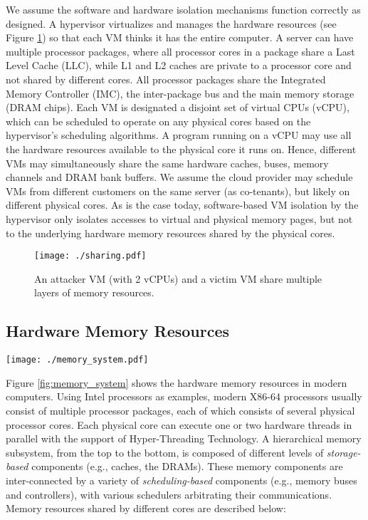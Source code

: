 \documentclass{sig-alternate}
\begin{document}
We assume the software and hardware isolation mechanisms function correctly as 
designed. A hypervisor virtualizes and manages the hardware resources (see Figure 
\ref{fig:sharing}) so that each VM thinks it has the entire computer. A server can 
have multiple processor packages, where all processor cores in a package share a 
Last Level Cache (LLC), while L1 and L2 caches are private to a processor core and not 
shared by different cores. All processor packages share the Integrated Memory 
Controller (IMC), the inter-package bus and the main memory storage (DRAM 
chips). Each VM is designated a disjoint set of virtual CPUs (vCPU), which can be 
scheduled to operate on any physical cores based on the hypervisor's scheduling 
algorithms. A program running on a vCPU may use all the hardware resources 
available to the physical core it runs on. Hence, different VMs may simultaneously 
share the same hardware caches, buses, memory channels and DRAM bank buffers. We 
assume the cloud provider may schedule VMs from different customers on the same 
server (as co-tenants), but likely on different physical cores. As is the case 
today, software-based VM isolation by the hypervisor only isolates accesses to 
virtual and physical memory pages, but not to the underlying hardware memory 
resources shared by the physical cores.


\begin{figure}[t]
\centerline{\mbox{\texttt{[image: ./sharing.pdf]}}}
\caption{An attacker VM (with 2 vCPUs) and a victim VM share multiple layers of memory resources.}
\label{fig:sharing}
\end{figure}

\subsection{Hardware Memory Resources}
\label{sec:overview:resource}

\begin{figure*}[t]
\centerline{\mbox{\texttt{[image: ./memory\_system.pdf]}} }
\caption{Shared storage-based and scheduling-based hardware memory resources in multi-core cloud servers.}
\label{fig:memory_system}
\end{figure*}

Figure \ref{fig:memory_system} shows the hardware memory resources in modern computers. Using Intel processors as examples, modern X86-64 processors usually consist of multiple processor packages, each of which consists of several physical processor cores. Each physical core can execute one or two hardware threads in parallel with the support of Hyper-Threading Technology. A hierarchical memory subsystem, from the top to the bottom, is composed of different levels of \emph{storage-based} components (e.g., caches, the DRAMs). These memory components are inter-connected by a variety of \emph{scheduling-based} components (e.g., memory buses and controllers), with various schedulers arbitrating their communications. Memory resources shared by different cores are described below:
\end{document}

